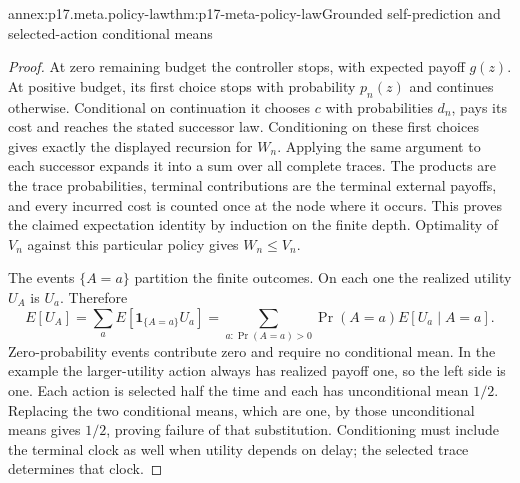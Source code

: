 \begin{annexitem}{annex:p17.meta.policy-law}{thm:p17-meta-policy-law}{Grounded self-prediction and selected-action conditional means}
\begin{proof}
At zero remaining budget the controller stops, with expected
payoff \(g(z)\). At positive budget, its first choice stops
with probability \(p_n(z)\) and continues otherwise. Conditional
on continuation it chooses \(c\) with probabilities \(d_n\),
pays its cost and reaches the stated successor law. Conditioning
on these first choices gives exactly the displayed recursion for
\(W_n\). Applying the same argument to each successor expands
it into a sum over all complete traces. The products are the
trace probabilities, terminal contributions are the terminal
external payoffs, and every incurred cost is counted once at
the node where it occurs. This proves the claimed expectation
identity by induction on the finite depth. Optimality of \(V_n\)
against this particular policy gives \(W_n\leq V_n\).

The events \(\{A=a\}\) partition the finite outcomes. On
each one the realized utility \(U_A\) is \(U_a\).
Therefore
\[
 E[U_A]=\sum_a E[\mathbf1_{\{A=a\}}U_a]
       =\sum_{a:\Pr(A=a)>0}\Pr(A=a)E[U_a\mid A=a].
\]
Zero-probability events contribute zero and require no conditional
mean. In the example the larger-utility action always has realized
payoff one, so the left side is one. Each action is selected half
the time and each has unconditional mean \(1/2\). Replacing
the two conditional means, which are one, by those unconditional
means gives \(1/2\), proving failure of that substitution.
Conditioning must include the terminal clock as well when utility
depends on delay; the selected trace determines that clock.
\end{proof}
\end{annexitem}


